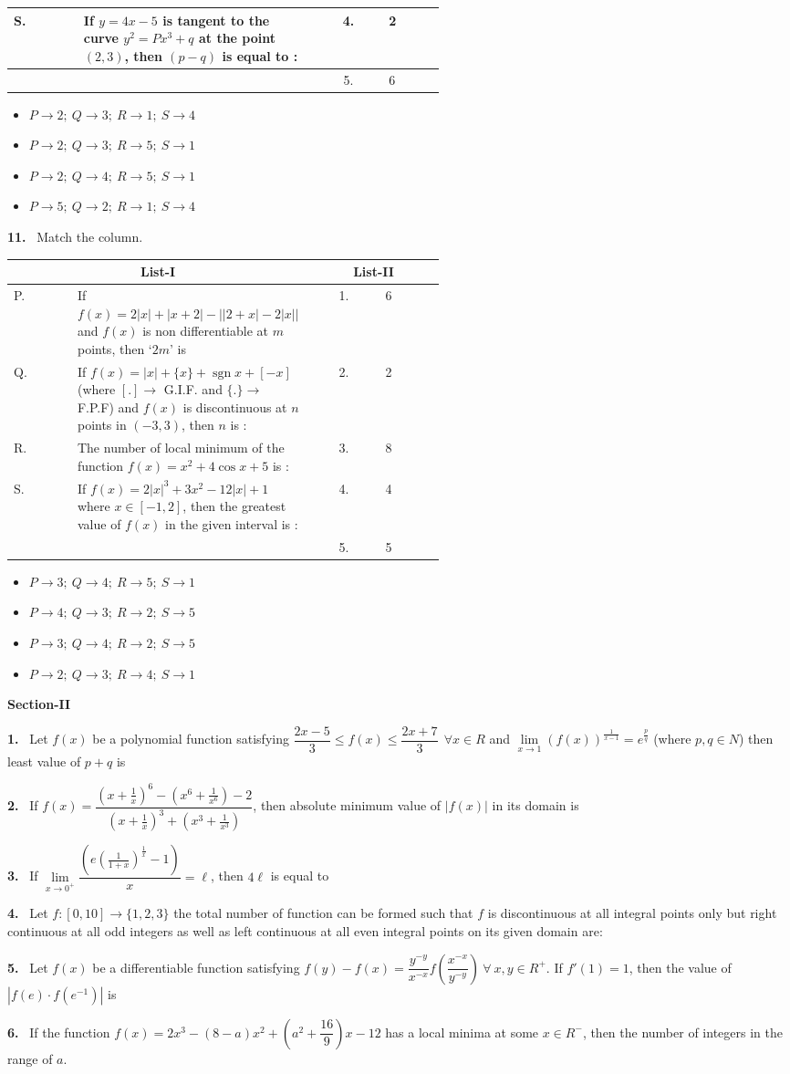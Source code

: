 \documentclass[10pt]{extarticle}
\newcommand{\sect}[1]{\par\smallskip\noindent\textbf{#1}\par}
\newcommand{\qn}[1]{\par\smallskip\noindent\textbf{#1.}~}
\newenvironment{qoptions}{\begin{itemize}[leftmargin=1.8em,itemsep=1pt,topsep=2pt,label={}]}{\end{itemize}}
\newcommand{\opt}[2]{\item[(#1)] #2}
\begin{document}
\begin{multicols}{2}
\begin{center}
\begin{tabular}{|l|p{0.55\linewidth}|c|l|}
S. & If $y=4x-5$ is tangent to the curve $y^2=Px^3+q$ at the point $(2,3)$, then $(p-q)$ is equal to : & 4. & 2\\\hline
 & & 5. & 6\\\hline
\end{tabular}
\end{center}
\begin{qoptions}
\opt{A}{$P\to2;\ Q\to3;\ R\to1;\ S\to4$}
\opt{B}{$P\to2;\ Q\to3;\ R\to5;\ S\to1$}
\opt{C}{$P\to2;\ Q\to4;\ R\to5;\ S\to1$}
\opt{D}{$P\to5;\ Q\to2;\ R\to1;\ S\to4$}
\end{qoptions}
\qn{11} Match the column.
\begin{center}\small
\begin{tabular}{|l|p{0.55\linewidth}|c|l|}\hline
\multicolumn{2}{|c|}{\textbf{List-I}} & \multicolumn{2}{c|}{\textbf{List-II}}\\\hline
P. & If $f(x)=2|x|+|x+2|-\big||2+x|-2|x|\big|$ and $f(x)$ is non differentiable at $m$ points, then `$2m$' is & 1. & 6\\\hline
Q. & If $f(x)=|x|+\{x\}+\operatorname{sgn}x+[-x]$ (where $[.]\to$ G.I.F. and $\{.\}\to$ F.P.F) and $f(x)$ is discontinuous at $n$ points in $(-3,3)$, then $n$ is : & 2. & 2\\\hline
R. & The number of local minimum of the function $f(x)=x^2+4\cos x+5$ is : & 3. & 8\\\hline
S. & If $f(x)=2|x|^3+3x^2-12|x|+1$ where $x\in[-1,2]$, then the greatest value of $f(x)$ in the given interval is : & 4. & 4\\\hline
 & & 5. & 5\\\hline
\end{tabular}
\end{center}
\begin{qoptions}
\opt{A}{$P\to3;\ Q\to4;\ R\to5;\ S\to1$}
\opt{B}{$P\to4;\ Q\to3;\ R\to2;\ S\to5$}
\opt{C}{$P\to3;\ Q\to4;\ R\to2;\ S\to5$}
\opt{D}{$P\to2;\ Q\to3;\ R\to4;\ S\to1$}
\end{qoptions}
\sect{Section-II}
\qn{1} Let $f(x)$ be a polynomial function satisfying $\dfrac{2x-5}{3}\le f(x)\le\dfrac{2x+7}{3}\ \ \forall x\in R$ and $\lim\limits_{x\to1}(f(x))^{\frac1{x-1}}=e^{\frac pq}$ (where $p,q\in N$) then least value of $p+q$ is
\qn{2} If $f(x)=\dfrac{\left(x+\frac1x\right)^6-\left(x^6+\frac1{x^6}\right)-2}{\left(x+\frac1x\right)^3+\left(x^3+\frac1{x^3}\right)}$, then absolute minimum value of $|f(x)|$ in its domain is
\qn{3} If $\lim\limits_{x\to0^+}\dfrac{\left(e\left(\frac1{1+x}\right)^{\frac1x}-1\right)}{x}=\ell$, then $4\ell$ is equal to
\qn{4} Let $f:[0,10]\to\{1,2,3\}$ the total number of function can be formed such that $f$ is discontinuous at all integral points only but right continuous at all odd integers as well as left continuous at all even integral points on its given domain are:
\qn{5} Let $f(x)$ be a differentiable function satisfying $f(y)-f(x)=\dfrac{y^{-y}}{x^{-x}}f\!\left(\dfrac{x^{-x}}{y^{-y}}\right)\ \forall\ x,y\in R^+$. If $f'(1)=1$, then the value of $\left|f(e)\cdot f\!\left(e^{-1}\right)\right|$ is
\qn{6} If the function $f(x)=2x^3-(8-a)x^2+\left(a^2+\dfrac{16}{9}\right)x-12$ has a local minima at some $x\in R^-$, then the number of integers in the range of $a$.
\end{multicols}
\end{document}
